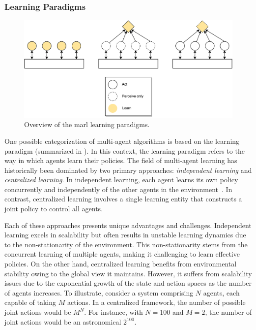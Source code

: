\subsubsection{Learning Paradigms}
\begin{figure}
  \includegraphics[width=\textwidth]{chapters/img/marl-policy-kind.drawio.pdf}
  \caption{Overview of the \ac{marl} learning paradigms.}\label{fig:marl:policy-kind}
\end{figure}
\sloppy
One possible categorization of multi-agent algorithms is based on the learning paradigm (summarized in ). 
 In this context, the learning paradigm refers to the way in which agents learn their policies. 
The field of multi-agent learning has historically been dominated by two primary approaches: 
 \emph{independent learning} and \emph{centralized learning}. 
 In independent learning, 
 each agent learns its own policy concurrently and independently of the other agents in the environment~\cite{tan1993multi}. 
 In contrast, centralized learning involves a single learning entity that constructs a joint policy to control all agents.

Each of these approaches presents unique advantages and challenges. 
 Independent learning excels in scalability but often results in unstable learning dynamics due to the non-stationarity of the environment. 
 This non-stationarity stems from the concurrent learning of multiple agents, making it challenging to learn effective policies. 
%
On the other hand, centralized learning benefits from environmental stability owing to the global view it maintains. 
 However, it suffers from scalability issues due to the exponential growth of the state and action spaces as the number of agents increases.
%
To illustrate, consider a system comprising \( N \) agents, 
 each capable of taking \( M \) actions. 
 In a centralized framework, the number of possible joint actions would be \( M^N \). 
 For instance, with \( N=100 \) and \( M=2 \), the number of joint actions would be an astronomical \( 2^{100} \).

